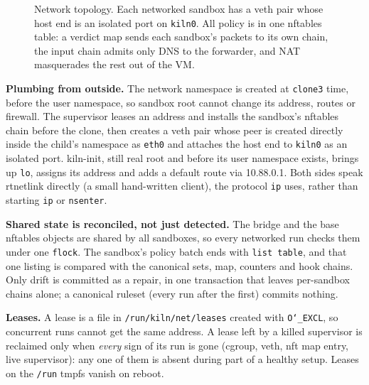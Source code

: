 \documentclass[10pt,letterpaper]{article}
\newcommand{\code}[1]{\texttt{#1}}
\newcommand{\us}{\char`\_}
\begin{document}
\begin{figure}[t]
\caption{Network topology. Each networked sandbox has a veth pair whose host end
is an isolated port on \code{kiln0}. All policy is in one nftables table: a
verdict map sends each sandbox's packets to its own chain, the input chain admits
only DNS to the forwarder, and NAT masquerades the rest out of the VM.}
\label{fig:net}
\end{figure}

\textbf{Plumbing from outside.} The network namespace is created at \code{clone3}
time, before the user namespace, so sandbox root cannot change its address,
routes or firewall. The supervisor leases an address and installs the sandbox's
nftables chain before the clone, then creates a veth pair whose peer is created
directly inside the child's namespace as \code{eth0} and attaches the host end to
\code{kiln0} as an isolated port. kiln-init, still real root and before its user
namespace exists, brings up \code{lo}, assigns its address and adds a default
route via 10.88.0.1. Both sides speak rtnetlink directly (a small hand-written
client), the protocol \code{ip} uses, rather than starting \code{ip} or
\code{nsenter}.

\textbf{Shared state is reconciled, not just detected.} The bridge and the base
nftables objects are shared by all sandboxes, so every networked run checks them
under one \code{flock}. The sandbox's policy batch ends with \code{list table},
and that one listing is compared with the canonical sets, map, counters and hook
chains. Only drift is committed as a repair, in one transaction that leaves
per-sandbox chains alone; a canonical ruleset (every run after the first) commits
nothing.

\textbf{Leases.} A lease is a file in \code{/run/kiln/net/leases} created with
\code{O\us{}EXCL}, so concurrent runs cannot get the same address. A lease left by
a killed supervisor is reclaimed only when \emph{every} sign of its run is gone
(cgroup, veth, nft map entry, live supervisor): any one of them is absent during
part of a healthy setup. Leases on the \code{/run} tmpfs vanish on reboot.
\end{document}
